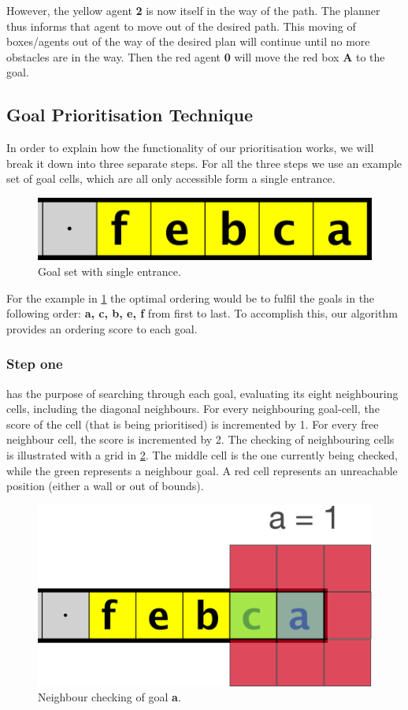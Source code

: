 However, the yellow agent \textbf{2} is now itself in the way of the path.
The planner thus informs that agent to move out of the desired path.
This moving of boxes/agents out of the way of the desired plan will continue until no more obstacles are in the way.
Then the red agent \textbf{0} will move the red box \textbf{A} to the goal.

\subsection{Goal Prioritisation Technique}
\label{methods:goal_ordering}

In order to explain how the functionality of our prioritisation works, we will break it down into three separate steps. For all the three steps we use an example set of goal cells, which are all only accessible form a single entrance. 

\begin{figure}[h!]
  \centering
  \includegraphics[width=.5\columnwidth]{graphics/ie_level.png}
  \caption{\label{fig:sample}Goal set with single entrance.}
\end{figure}

For the example in \cref{fig:sample} the optimal ordering would be to fulfil the goals in the following order: \textbf{a, c, b, e, f} from first to last. 
To accomplish this, our algorithm provides an ordering score to each goal. 

\subsubsection{Step one}has the purpose of searching through each goal, evaluating its eight neighbouring cells, including the diagonal neighbours. 
For every neighbouring goal-cell, the score of the cell (that is being prioritised) is incremented by 1.
For every free neighbour cell, the score is incremented by 2. 
The checking of neighbouring cells is illustrated with a grid in \cref{fig:grid1}. 
The middle cell is the one currently being checked, while the green represents a neighbour goal. 
A red cell represents an unreachable position (either a wall or out of bounds).

\begin{figure}[ht!]
  \centering
  \includegraphics[width=.5\columnwidth]{graphics/goal_pri_1.png}
  \caption{\label{fig:grid1}Neighbour checking of goal \textbf{a}.}
\end{figure}

